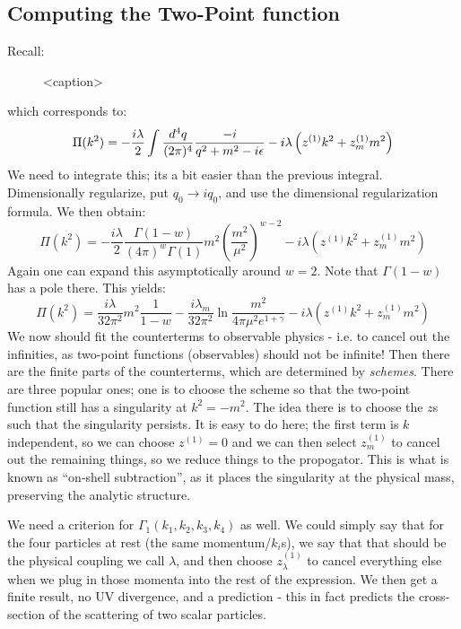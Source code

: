 \subsection{Computing the Two-Point function}
Recall:
\begin{figure}[htbp]
    \centering
    
    \caption{<caption>}
    \label{<label>}
\end{figure}
which corresponds to:
\begin{equation}
    \Pi(k^2) = -\frac{i\lambda}{2}\int \frac{d^4q}{(2\pi)^4} \frac{-i}{q^2 + m^2 - i\epsilon} - i\lambda \left(z^{(1)}k^2 + z^{(1)}_m m^2\right)
\end{equation}
We need to integrate this; its a bit easier than the previous integral. Dimensionally regularize, put $q_0 \to iq_0$, and use the dimensional regularization formula. We then obtain:
\begin{equation}
    \Pi(k^2) = -\frac{i\lambda}{2}\frac{\Gamma(1 - w)}{(4\pi)^w \Gamma(1)}m^2\left(\frac{m^2}{\mu^2}\right)^{w-2} - i\lambda\left(z^{(1)}k^2 + z^{(1)}_m m^2\right)
\end{equation}
Again one can expand this asymptotically around $w = 2$. Note that $\Gamma(1 - w)$ has a pole there. This yields:
\begin{equation}
    \Pi(k^2) =  \frac{i\lambda}{32\pi^2}m^2\frac{1}{1-w} - \frac{i\lambda_m}{32\pi^2}\ln\frac{m^2}{4\pi \mu^2 e^{1+\gamma}} - i\lambda\left(z^{(1)}k^2 + z^{(1)}_m m^2\right)
\end{equation}
We now should fit the counterterms to observable physics - i.e. to cancel out the infinities, as two-point functions (observables) should not be infinite! Then there are the finite parts of the counterterms, which are determined by \emph{schemes}. There are three popular ones; one is to choose the scheme so that the two-point function still has a singularity at $k^2 = -m^2$. The idea there is to choose the $z$s such that the singularity persists. It is easy to do here; the first term is $k$ independent, so we can choose $z^{(1)} = 0$ and we can then select $z^{(1)}_m$ to cancel out the remaining things, so we reduce things to the propogator. This is what is known as ``on-shell subtraction'', as it places the singularity at the physical mass, preserving the analytic structure.

We need a criterion for $\Gamma_1(k_1, k_2, k_3, k_4)$ as well. We could simply say that for the four particles at rest (the same momentum/$k_i$s), we say that that should be the physical coupling we call $\lambda$, and then choose $z_\lambda^{(1)}$ to cancel everything else when we plug in those momenta into the rest of the expression. We then get a finite result, no UV divergence, and a prediction - this in fact predicts the cross-section of the scattering of two scalar particles.

